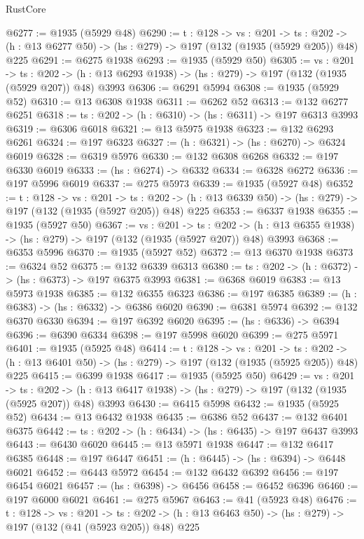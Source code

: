 \begin{lexlean}{RustCore}
\begin{coremodule}
@6277 := @1935 (@5929 @48)
@6290 := {t : @128} ->
  {vs : @201} ->
  {ts : @202} -> (h : @13 @6277 @50) -> (hs : @279) -> @197 (@132 (@1935 (@5929 @205)) @48) @225
@6291 := @6275 @1938
@6293 := @1935 (@5929 @50)
@6305 := {vs : @201} ->
  {ts : @202} -> (h : @13 @6293 @1938) -> (hs : @279) -> @197 (@132 (@1935 (@5929 @207)) @48) @3993
@6306 := @6291 @5994
@6308 := @1935 (@5929 @52)
@6310 := @13 @6308 @1938
@6311 := @6262 @52
@6313 := @132 @6277 @6251
@6318 := {ts : @202} -> (h : @6310) -> (hs : @6311) -> @197 @6313 @3993
@6319 := @6306 @6018
@6321 := @13 @5975 @1938
@6323 := @132 @6293 @6261
@6324 := @197 @6323
@6327 := (h : @6321) -> (hs : @6270) -> @6324 @6019
@6328 := @6319 @5976
@6330 := @132 @6308 @6268
@6332 := @197 @6330 @6019
@6333 := (hs : @6274) -> @6332
@6334 := @6328 @6272
@6336 := @197 @5996 @6019
@6337 := @275 @5973
@6339 := @1935 (@5927 @48)
@6352 := {t : @128} ->
  {vs : @201} ->
  {ts : @202} -> (h : @13 @6339 @50) -> (hs : @279) -> @197 (@132 (@1935 (@5927 @205)) @48) @225
@6353 := @6337 @1938
@6355 := @1935 (@5927 @50)
@6367 := {vs : @201} ->
  {ts : @202} -> (h : @13 @6355 @1938) -> (hs : @279) -> @197 (@132 (@1935 (@5927 @207)) @48) @3993
@6368 := @6353 @5996
@6370 := @1935 (@5927 @52)
@6372 := @13 @6370 @1938
@6373 := @6324 @52
@6375 := @132 @6339 @6313
@6380 := {ts : @202} -> (h : @6372) -> (hs : @6373) -> @197 @6375 @3993
@6381 := @6368 @6019
@6383 := @13 @5973 @1938
@6385 := @132 @6355 @6323
@6386 := @197 @6385
@6389 := (h : @6383) -> (hs : @6332) -> @6386 @6020
@6390 := @6381 @5974
@6392 := @132 @6370 @6330
@6394 := @197 @6392 @6020
@6395 := (hs : @6336) -> @6394
@6396 := @6390 @6334
@6398 := @197 @5998 @6020
@6399 := @275 @5971
@6401 := @1935 (@5925 @48)
@6414 := {t : @128} ->
  {vs : @201} ->
  {ts : @202} -> (h : @13 @6401 @50) -> (hs : @279) -> @197 (@132 (@1935 (@5925 @205)) @48) @225
@6415 := @6399 @1938
@6417 := @1935 (@5925 @50)
@6429 := {vs : @201} ->
  {ts : @202} -> (h : @13 @6417 @1938) -> (hs : @279) -> @197 (@132 (@1935 (@5925 @207)) @48) @3993
@6430 := @6415 @5998
@6432 := @1935 (@5925 @52)
@6434 := @13 @6432 @1938
@6435 := @6386 @52
@6437 := @132 @6401 @6375
@6442 := {ts : @202} -> (h : @6434) -> (hs : @6435) -> @197 @6437 @3993
@6443 := @6430 @6020
@6445 := @13 @5971 @1938
@6447 := @132 @6417 @6385
@6448 := @197 @6447
@6451 := (h : @6445) -> (hs : @6394) -> @6448 @6021
@6452 := @6443 @5972
@6454 := @132 @6432 @6392
@6456 := @197 @6454 @6021
@6457 := (hs : @6398) -> @6456
@6458 := @6452 @6396
@6460 := @197 @6000 @6021
@6461 := @275 @5967
@6463 := @41 (@5923 @48)
@6476 := {t : @128} ->
  {vs : @201} ->
  {ts : @202} -> (h : @13 @6463 @50) -> (hs : @279) -> @197 (@132 (@41 (@5923 @205)) @48) @225

\end{coremodule}
\end{lexlean}
